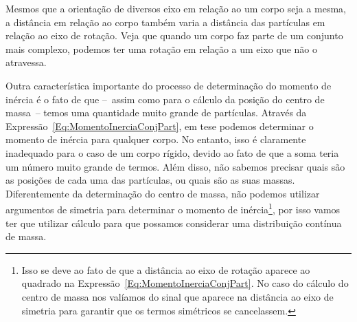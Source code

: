 \begin{marginfigure}[-5cm]
\centering
{}
\caption{Mesmos que a orientação de diversos eixo em relação ao um corpo seja a mesma, a distância em relação ao corpo também varia a distância das partículas em relação ao eixo de rotação. Veja que quando um corpo faz parte de um conjunto mais complexo, podemos ter uma rotação em relação a um eixo que não o atravessa. \label{Fig:MomInerciaRotEixosParalelos}}
\end{marginfigure}

Outra característica importante do processo de determinação do momento de inércia é o fato de que --~assim como para o cálculo da posição do centro de massa~-- temos uma quantidade muito grande de partículas. Através da Expressão~\ref{Eq:MomentoInerciaConjPart}, em tese podemos determinar o momento de inércia para qualquer corpo. No entanto, isso é claramente inadequado para o caso de um corpo rígido, devido ao fato de que a soma teria um número muito grande de termos. Além disso, não sabemos precisar quais são as posições de cada uma das partículas, ou quais são as suas massas. Diferentemente da determinação do centro de massa, não podemos utilizar argumentos de simetria para determinar o momento de inércia\footnote{Isso se deve ao fato de que a distância ao eixo de rotação aparece ao quadrado na Expressão~\ref{Eq:MomentoInerciaConjPart}. No caso do cálculo do centro de massa nos valíamos do sinal que aparece na distância ao eixo de simetria para garantir que os termos simétricos se cancelassem.}, por isso vamos ter que utilizar cálculo para que possamos considerar uma distribuição contínua de massa.

